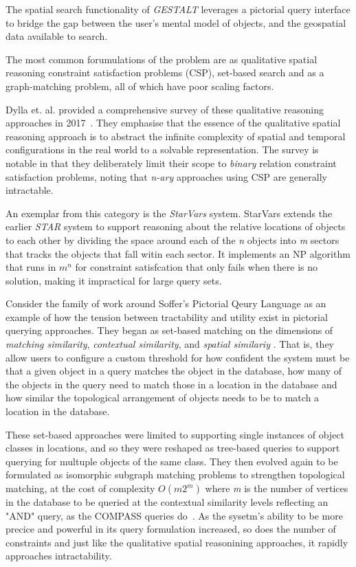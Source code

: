 \par{The spatial search functionality of \emph{GESTALT} leverages a pictorial query interface to bridge the gap between the user's mental model of objects, and the geospatial data available to search. 

The most common forumulations of the problem are as qualitative spatial reasoning constraint satisfaction problems (CSP), set-based search and as a graph-matching problem, all of which have poor scaling factors.}
% 
\par{Dylla et. al. provided a comprehensive survey of these qualitative reasoning approaches in 2017~\cite{Dylla2017}. 
They emphasise that the essence of the qualitative spatial reasoning approach is to abstract the infinite complexity of spatial and temporal configurations in the real world to a solvable representation. 
The survey is notable in that they deliberately limit their scope to \textit{binary} relation constraint satisfaction problems, noting that \textit{n-ary} approaches using CSP are generally intractable.}
\par{
An exemplar from this category is the \textit{StarVars} system. 
StarVars extends the earlier \textit{STAR} system to support reasoning about the relative locations of objects to each other by dividing the space around each of the \textit{n} objects into \textit{m} sectors that tracks the objects that fall witin each sector. 
It implements an NP algorithm that runs in $m^n$ for constraint satisfcation that only fails when there is no solution, making it impractical for large query sets.}
%
\par{Consider the family of work around Soffer's Pictorial Qeury Language as an example of how the tension between tractability and utility exist in pictorial querying approaches. 
They began as set-based matching on the dimensions of \textit{matching similarity}, \textit{contextual similarity}, and \textit{spatial similariy} \cite{Soffer1997} \cite{Soffer1998a}. 
That is, they allow users to configure a custom threshold for how confident the system must be that a given object in a query matches the object in the database, how many of the objects in the query need to match those in a location in the database and how similar the topological arrangement of objects needs to be to match a location in the database.}
%
\par{These set-based approaches were limited to supporting single instances of object classes in locations, and so they were reshaped as tree-based queries \cite{Soffer1999} to support querying for multuple objects of the same class.
They then evolved again to be formulated as isomorphic subgraph matching problems to strengthen topological matching, at the cost of complexity $O(m2^m)$ where \textit{m} is the number of vertices in the database to be queried at the contextual similarity levels reflecting an "AND" query, as the COMPASS queries do~\cite{Folkers2000}.
As the sysetm's ability to be more precice and powerful in its query formulation increased, so does the number of constraints and just like the qualitative spatial reasonining approaches, it rapidly approaches intractability.}
